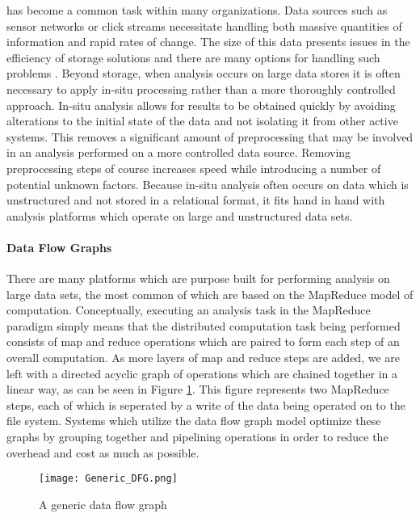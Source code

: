  has become a common task within many organizations. Data sources such as sensor networks or click streams necessitate handling both massive quantities of information and rapid rates of change. The size of this data presents issues in the efficiency of storage solutions and there are many options for handling such problems \cite{Klasky2011}. Beyond storage, when analysis occurs on large data stores it is often necessary to apply in-situ processing rather than a more thoroughly controlled approach. In-situ analysis allows for results to be obtained quickly by avoiding alterations to the initial state of the data and not isolating it from other active systems. This removes a significant amount of preprocessing that may be involved in an analysis performed on a more controlled data source. Removing preprocessing steps of course increases speed while introducing a number of potential unknown factors. Because in-situ analysis often occurs on data which is unstructured and not stored in a relational format, it fits hand in hand with analysis platforms which operate on large and unstructured data sets.

\paragraph{Data Flow Graphs}
There are many platforms which are purpose built for performing analysis on large data sets, the most common of which are based on the MapReduce model of computation. Conceptually, executing an analysis task in the MapReduce paradigm simply means that the distributed computation task being performed consists of map and reduce operations which are paired to form each step of an overall computation. As more layers of map and reduce steps are added, we are left with a directed acyclic graph of operations which are chained together in a linear way, as can be seen in  Figure \ref{fig:dfg}. This figure represents two MapReduce steps, each of which is seperated by a write of the data being operated on to the file system. Systems which utilize the data flow graph model optimize these graphs by grouping together and pipelining operations in order to reduce the overhead and cost as much as possible.

\begin{figure}
	\centering
	\texttt{[image: Generic\_DFG.png]}
	\caption{A generic data flow graph \cite{Ho2008}}
	\label{fig:dfg}
\end{figure}

